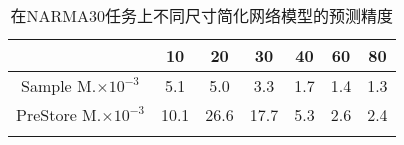 \begin{center}
\begin{table}
	\caption{在NARMA30任务上不同尺寸简化网络模型的预测精度}
	\renewcommand\arraystretch{1.2}
	\setlength{\tabcolsep}{12pt}
	\begin{tabular}{ccccccc}
	\toprule
		 							&	10		&	20		&	30		&	40		&	60		&	80		\\	\midrule
	Sample M.\(\times 10^{-3}\)		&	5.1		&	5.0		&	3.3		&	1.7		&	1.4		&	1.3	 \\	\hline
	PreStore M.\(\times 10^{-3}\)	&	10.1	&	26.6		&	17.7		&	5.3		&	2.6		&	2.4	\\	
	\bottomrule
	\label{tab:narma30}
	\end{tabular}
\end{table}
\vspace{-4em}
\end{center}

